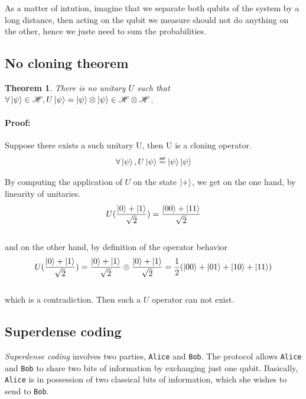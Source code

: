 \documentclass{article}
\newtheorem{theorem}{Theorem}
\newcommand\eqdef{\mathrel{\overset{\makebox[0pt]{\mbox{\normalfont\tiny\sffamily
def}}}{=}}}
\begin{document}
As a matter of intution, imagine that we separate both qubits of
the system by a long distance, then acting on the qubit we measure should not do
anything on the other, hence we juste need to sum the probabilities.

\subsection{No cloning theorem}
\begin{theorem}
    There is no unitary $U$ such that $\forall \ket{\psi} \in \mathscr{H},
    U\ket{\psi} = \ket{\psi} \otimes \ket{\psi} \in \mathscr{H} \otimes
    \mathscr{H}$.
\end{theorem}
\paragraph{Proof: }
Suppose there exists a such unitary U, then U is a cloning operator.
\begin{equation}
    \begin{aligned}
        \forall \ket{\psi}, U\ket{\psi} \eqdef \ket{\psi}\ket{\psi}
    \end{aligned}
\end{equation}

By computing the application of $U$ on the state $\ket{+}$, we get on the one
hand, by linearity of unitaries.
\begin{equation}
    U(\frac{\ket{0}+\ket{1}}{\sqrt{2}}) = \frac{\ket{00}+\ket{11}}{\sqrt{2}}
\end{equation}
\\
and on the other hand, by definition of the operator behavior
\begin{equation}
    U(\frac{\ket{0}+\ket{1}}{\sqrt{2}}) = \frac{\ket{0}+\ket{1}}{\sqrt{2}}
    \otimes \frac{\ket{0}+\ket{1}}{\sqrt{2}}
    =\frac{1}{2}(\ket{00}+\ket{01}+\ket{10}+\ket{11})
\end{equation}
\\
which is a contradiction. Then such a $U$ operator can not exist.

\subsection{Superdense coding}
\textit{Superdense coding} involves two parties, \texttt{Alice} and
\texttt{Bob}. The protocol allows \texttt{Alice} and \texttt{Bob} to share two
bits of information by exchanging just one qubit. Basically, \texttt{Alice} is
in possession of two classical bits of information, which she wishes to send to
\texttt{Bob}.
\end{document}
